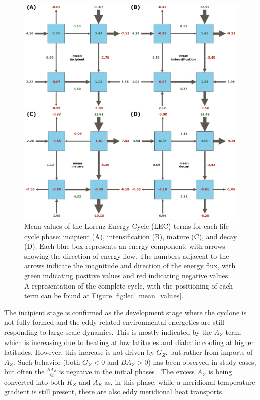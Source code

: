 \begin{figure}[!htbp]
\centering
\includegraphics[width=\textwidth]{figs_5/lec_mean_values_phases.pdf}
\caption[LEC - Mean Life Cycle for Each Phase]{Mean values of the Lorenz Energy Cycle (LEC) terms for each life cycle phase: incipient (A), intensification (B), mature (C), and decay (D). Each blue box represents an energy component, with arrows showing the direction of energy flow. The numbers adjacent to the arrows indicate the magnitude and direction of the energy flux, with green indicating positive values and red indicating negative values. A representation of the complete cycle, with the positioning of each term can be found at Figure \ref{fig:lec_mean_values}.}
\label{fig:lec_mean_values_phases}
\end{figure}

The incipient stage is confirmed as the development stage where the cyclone is not fully formed and the eddy-related environmental energetics are still responding to large-scale dynamics. This is mostly indicated by the $A_Z$ term, which is increasing due to heating at low latitudes and diabatic cooling at higher latitudes. However, this increase is not driven by $G_Z$, but rather from imports of $A_Z$. Such behavior (both $G_Z < 0$ and $BA_Z > 0$) has been observed in study cases, but often the $\frac{\partial A_Z}{\partial t}$ is negative in the initial phases \citep[e.g.,]{brennan1980zonal,dias2011energy,dias2013synoptic}. The excess $A_Z$ is being converted into both $K_Z$ and $A_E$ as, in this phase, while a meridional temperature gradient is still present, there are also eddy meridional heat transports.

